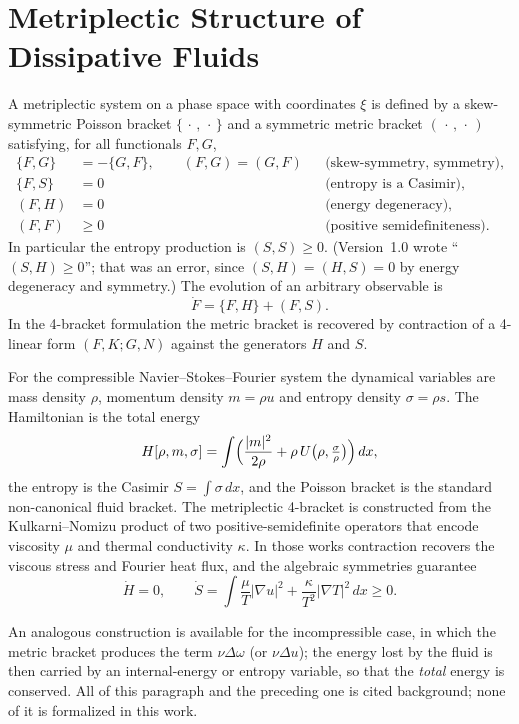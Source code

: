 \documentclass[11pt,a4paper]{article}
\begin{document}
\section{Metriplectic Structure of Dissipative Fluids}
A metriplectic system on a phase space with coordinates \(\xi\) is defined by a skew-symmetric Poisson bracket \(\{\,\cdot\,,\,\cdot\,\}\) and a symmetric metric bracket \((\,\cdot\,,\,\cdot\,)\) satisfying, for all functionals \(F,G\),
\begin{align}
\{F,G\} &= -\{G,F\},\qquad (F,G)=(G,F) && \text{(skew-symmetry, symmetry)},\\
\{F,S\} &= 0 && \text{(entropy is a Casimir)},\\
(F,H) &= 0 && \text{(energy degeneracy)},\\
(F,F) &\ge 0 && \text{(positive semidefiniteness)}.
\end{align}
In particular the entropy production is \((S,S)\ge 0\). (Version~1.0 wrote ``\((S,H)\ge0\)''; that was an error, since \((S,H)=(H,S)=0\) by energy degeneracy and symmetry.)
The evolution of an arbitrary observable is
\begin{equation}
\dot F = \{F,H\} + (F,S).
\end{equation}
In the 4-bracket formulation the metric bracket is recovered by contraction of a 4-linear form \((F,K;G,N)\) against the generators \(H\) and \(S\).

For the compressible Navier--Stokes--Fourier system the dynamical variables are mass density \(\rho\), momentum density \(m=\rho u\) and entropy density \(\sigma=\rho s\). The Hamiltonian is the total energy
\begin{equation}
H[\rho,m,\sigma] = \int\Bigl(\frac{|m|^2}{2\rho}+\rho\,U\bigl(\rho,\tfrac{\sigma}{\rho}\bigr)\Bigr)\,dx,
\end{equation}
the entropy is the Casimir \(S=\int\sigma\,dx\), and the Poisson bracket is the standard non-canonical fluid bracket. The metriplectic 4-bracket is constructed from the Kulkarni--Nomizu product of two positive-semidefinite operators that encode viscosity \(\mu\) and thermal conductivity \(\kappa\). In those works \cite{MorrisonUpdike2024,BarhamMorrisonZaidni2024} contraction recovers the viscous stress and Fourier heat flux, and the algebraic symmetries guarantee
\begin{equation}
\dot H=0,\qquad\dot S=\int\frac{\mu}{T}|\nabla u|^2+\frac{\kappa}{T^2}|\nabla T|^2\,dx\ge0.
\end{equation}

An analogous construction is available for the incompressible case, in which the metric bracket produces the term \(\nu\Delta\omega\) (or \(\nu\Delta u\)); the energy lost by the fluid is then carried by an internal-energy or entropy variable, so that the \emph{total} energy is conserved. All of this paragraph and the preceding one is cited background; none of it is formalized in this work.
\end{document}
